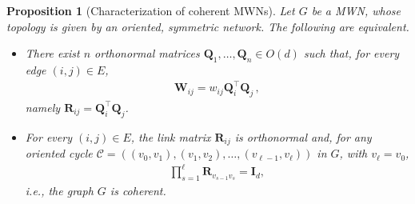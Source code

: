 \documentclass[aps,showpacs,preprintnumbers,amsmath,amssymb,twocolumn,superscriptaddress,floatfix,nofootinbib,10pt,pre]{revtex4-1}
\newtheorem{prop}[theorem]{Proposition}
\begin{document}
\begin{prop}[Characterization of coherent MWNs]\label{prop:coherence}
Let $G$ be a MWN, whose topology is given by an oriented, symmetric network. The following are equivalent.
\begin{itemize}
    \item[(a)] There exist $n$ orthonormal matrices $\mathbf{Q}_1,\dots,\mathbf{Q}_n\in O(d)$ such that, for every edge $(i,j)\in E$,
    \begin{align}
        \mathbf{W}_{ij} = w_{ij}\mathbf{Q}_i^\top \mathbf{Q}_j\, ,
    \end{align}
    namely $\mathbf{R}_{ij}=\mathbf{Q}_i^\top \mathbf{Q}_j$.
    \item[(b)] For every $(i,j)\in E$, the link matrix $\mathbf{R}_{ij}$ is orthonormal and, for any oriented cycle 
    $\mathcal C=((v_0,v_1),(v_1,v_2),\dots,(v_{\ell-1},v_{\ell}))$ in $G$, with $v_{\ell}=v_0$,
    \begin{align}
        \prod_{s=1}^\ell \mathbf{R}_{v_{s-1}v_s} = \mathbf{I}_d,
    \end{align}
    i.e., the graph $G$ is coherent.
\end{itemize}
\end{prop}
\end{document}
